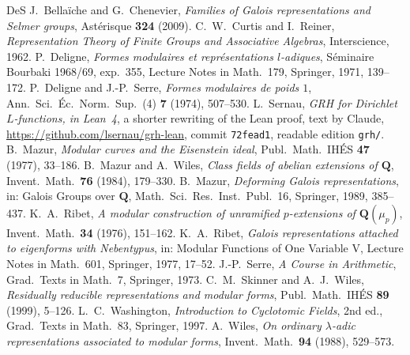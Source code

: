 \documentclass[reqno]{amsart}
\theoremstyle{definition}
\theoremstyle{plain}
\begin{document}
\begin{thebibliography}{DeS}
 J.~Bella\"iche and G.~Chenevier, \emph{Families of Galois representations and Selmer groups}, Ast\'erisque \textbf{324} (2009).
 C.~W.~Curtis and I.~Reiner, \emph{Representation Theory of Finite Groups and Associative Algebras}, Interscience, 1962.
 P.~Deligne, \emph{Formes modulaires et repr\'esentations \(l\)-adiques}, S\'eminaire Bourbaki 1968/69, exp.~355, Lecture Notes in Math.\ 179, Springer, 1971, 139--172.
 P.~Deligne and J.-P.~Serre, \emph{Formes modulaires de poids \(1\)}, Ann.\ Sci.\ \'Ec.\ Norm.\ Sup.\ (4) \textbf{7} (1974), 507--530.
 L.~Sernau, \emph{GRH for Dirichlet \(L\)-functions, in Lean~4}, a shorter rewriting of the Lean proof, text by Claude, \url{https://github.com/lsernau/grh-lean}, commit \texttt{72fead1}, readable edition \texttt{grh/}.
 B.~Mazur, \emph{Modular curves and the Eisenstein ideal}, Publ.\ Math.\ IH\'ES \textbf{47} (1977), 33--186.
 B.~Mazur and A.~Wiles, \emph{Class fields of abelian extensions of \(\mathbf{Q}\)}, Invent.\ Math.\ \textbf{76} (1984), 179--330.
 B.~Mazur, \emph{Deforming Galois representations}, in: Galois Groups over \(\mathbf{Q}\), Math.\ Sci.\ Res.\ Inst.\ Publ.\ 16, Springer, 1989, 385--437.
 K.~A.~Ribet, \emph{A modular construction of unramified \(p\)-extensions of \(\mathbf{Q}(\mu_p)\)}, Invent.\ Math.\ \textbf{34} (1976), 151--162.
 K.~A.~Ribet, \emph{Galois representations attached to eigenforms with Nebentypus}, in: Modular Functions of One Variable V, Lecture Notes in Math.\ 601, Springer, 1977, 17--52.
 J.-P.~Serre, \emph{A Course in Arithmetic}, Grad.\ Texts in Math.\ 7, Springer, 1973.
 C.~M.~Skinner and A.~J.~Wiles, \emph{Residually reducible representations and modular forms}, Publ.\ Math.\ IH\'ES \textbf{89} (1999), 5--126.
 L.~C.~Washington, \emph{Introduction to Cyclotomic Fields}, 2nd ed., Grad.\ Texts in Math.\ 83, Springer, 1997.
 A.~Wiles, \emph{On ordinary \(\lambda\)-adic representations associated to modular forms}, Invent.\ Math.\ \textbf{94} (1988), 529--573.
\end{thebibliography}
\end{document}
